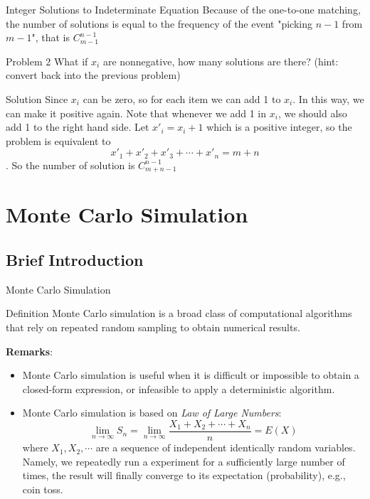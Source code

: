 \documentclass{beamer}
\begin{document}
\begin{frame}{Integer Solutions to Indeterminate Equation}
Because of the one-to-one matching, the number of solutions is equal to the frequency of the event "picking $n-1$ from $m-1$", that is $C_{m-1}^{n-1}$

\begin{block}{Problem 2}
What if $x_i$ are nonnegative, how many solutions are there? (hint: convert back into the previous problem)
\end{block}
\begin{block}{Solution}
Since $x_i$ can be zero, so for each item we can add 1 to $x_i$. In this way, we can make it positive again. Note that whenever we add 1 in $x_i$, we should also add 1 to the right hand side. Let $x'_i=x_i+1$ which is a positive integer, so the problem is equivalent to $$x'_1+x'_2+x'_3+\cdots+x'_n=m+n$$. So the number of solution is $C_{m+n-1}^{n-1}$
\end{block}
\end{frame}

\section{Monte Carlo Simulation}
\subsection{Brief Introduction}

\begin{frame}{Monte Carlo Simulation}
\begin{block}{Definition}
Monte Carlo simulation is a broad class of computational algorithms that rely on repeated random sampling to obtain numerical results.
\end{block}
\textbf{Remarks}:
\begin{itemize}
\item Monte Carlo simulation is useful when it is difficult or impossible to obtain a closed-form expression, or infeasible to apply a deterministic algorithm.
\item Monte Carlo simulation is based on \textit{Law of Large Numbers}:
$$\lim_{n\to \infty}S_n=\lim_{n\to \infty}\frac{X_1+X_2+\cdots+X_n}{n}=E(X)$$
where $X_1,X_2,\cdots$ are a sequence of independent identically random variables. Namely, we repeatedly run a experiment for a sufficiently large number of times, the result will finally converge to its expectation (probability), e.g., coin toss.
\end{itemize}
\end{frame}
\end{document}

